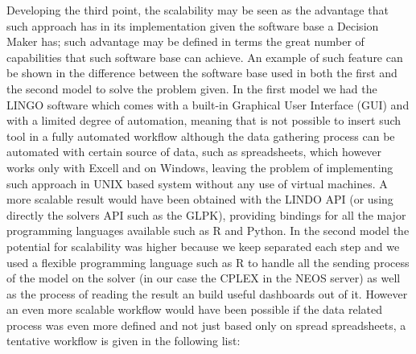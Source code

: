 \begin{doublespace}
Developing the third point, the scalability may be seen as the advantage that such approach has in its implementation given the software base a Decision Maker has; such advantage may be defined in terms the great number of capabilities that such software base can achieve. An example of such feature can be shown in the difference between the software base used in both the first and the second model to solve the problem given.
In the first model we had the LINGO software which comes with a built-in Graphical User Interface (GUI) and  with a limited degree of automation, meaning that is not possible to insert such tool in a fully automated workflow although the data gathering process can be automated with certain source of data, such as spreadsheets, which however works only with Excell and on Windows, leaving the problem of implementing such approach in UNIX based system without any use of virtual machines. A more scalable result would have been obtained with the LINDO API (or using directly the solvers API such as the GLPK\cite{Sottinen2009}),  providing bindings for all the major programming languages available such as R and Python. 
In the second model the potential for scalability was higher because we keep separated each step and we used a flexible programming language such as R to handle all the sending process of the model on the solver (in our case the CPLEX in the NEOS server) as well as the process of reading the result an build useful dashboards out of it. 
However an even more scalable workflow would have been possible if the data related process was even more defined and not just based only on spread spreadsheets, a tentative workflow is given in the following list:


\end{doublespace}
